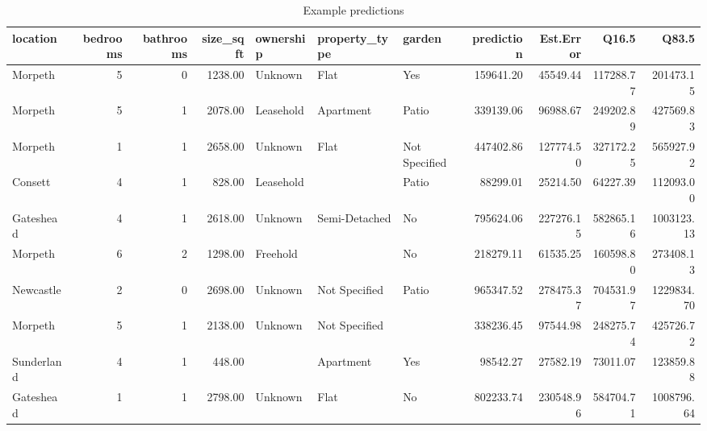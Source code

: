 \begin{table}[ht]
\centering
\caption{Example predictions} 
\label{tab:pred}
\begin{tabular}{lrrrlllrrrr}
  \hline
location & bedrooms & bathrooms & size\_sqft & ownership & property\_type & garden & prediction & Est.Error & Q16.5 & Q83.5 \\ 
  \hline
Morpeth &   5 &   0 & 1238.00 & Unknown & Flat & Yes & 159641.20 & 45549.44 & 117288.77 & 201473.15 \\ 
  Morpeth &   5 &   1 & 2078.00 & Leasehold & Apartment & Patio & 339139.06 & 96988.67 & 249202.89 & 427569.83 \\ 
  Morpeth &   1 &   1 & 2658.00 & Unknown & Flat & Not Specified & 447402.86 & 127774.50 & 327172.25 & 565927.92 \\ 
  Consett &   4 &   1 & 828.00 & Leasehold &  & Patio & 88299.01 & 25214.50 & 64227.39 & 112093.00 \\ 
  Gateshead &   4 &   1 & 2618.00 & Unknown & Semi-Detached & No & 795624.06 & 227276.15 & 582865.16 & 1003123.13 \\ 
  Morpeth &   6 &   2 & 1298.00 & Freehold &  & No & 218279.11 & 61535.25 & 160598.80 & 273408.13 \\ 
  Newcastle &   2 &   0 & 2698.00 & Unknown & Not Specified & Patio & 965347.52 & 278475.37 & 704531.97 & 1229834.70 \\ 
  Morpeth &   5 &   1 & 2138.00 & Unknown & Not Specified &  & 338236.45 & 97544.98 & 248275.74 & 425726.72 \\ 
  Sunderland &   4 &   1 & 448.00 &  & Apartment & Yes & 98542.27 & 27582.19 & 73011.07 & 123859.88 \\ 
  Gateshead &   1 &   1 & 2798.00 & Unknown & Flat & No & 802233.74 & 230548.96 & 584704.71 & 1008796.64 \\ 
   \hline
\end{tabular}
\end{table}

